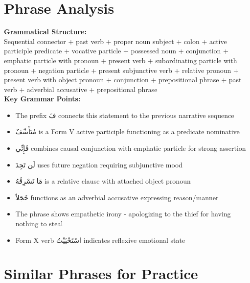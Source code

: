 \documentclass[letterpaper,12pt]{article}
\begin{document}
\section{Phrase Analysis}
\begin{tcolorbox}[colback=boxcolor,colframe=headercolor,breakable]
\textbf{Grammatical Structure:}\\
Sequential connector + past verb + proper noun subject + colon + active participle predicate + vocative particle + possessed noun + conjunction + emphatic particle with pronoun + present verb + subordinating particle with pronoun + negation particle + present subjunctive verb + relative pronoun + present verb with object pronoun + conjunction + prepositional phrase + past verb + adverbial accusative + prepositional phrase \\[0.5em]
\textbf{Key Grammar Points:}
\begin{itemize}
\item The prefix \textarabic{فَ} connects this statement to the previous narrative sequence
\item \textarabic{مُتَأَسِّفٌ} is a Form V active participle functioning as a predicate nominative
\item \textarabic{فَإِنِّي} combines causal conjunction with emphatic particle for strong assertion
\item \textarabic{لَن تَجِدَ} uses future negation requiring subjunctive mood
\item \textarabic{مَا تَسْرِقُهُ} is a relative clause with attached object pronoun
\item \textarabic{خَجَلاً} functions as an adverbial accusative expressing reason/manner
\item The phrase shows empathetic irony - apologizing to the thief for having nothing to steal
\item Form X verb \textarabic{اسْتَحْيَيْتُ} indicates reflexive emotional state
\end{itemize}
\end{tcolorbox}

\section{Similar Phrases for Practice}
\end{document}
